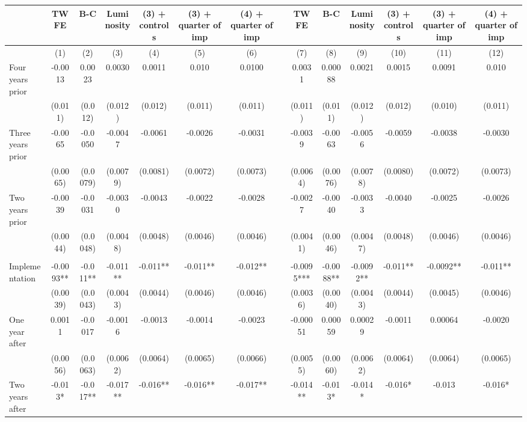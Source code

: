 \begin{tabular}{lccccccccccccc}
\toprule
      & TWFE  & B-C   & Luminosity & (3) + controls & (3) + quarter of imp & (4) + quarter of imp &       & TWFE  & B-C   & Luminosity & (3) + controls & (3) + quarter of imp & (4) + quarter of imp \\
\midrule
      & (1)   & (2)   & (3)   & (4)   & (5)   & (6)   &       & (7)   & (8)   & (9)   & (10)  & (11)  & (12) \\
\midrule
\midrule
Four years prior & -0.0013 & 0.0023 & 0.0030 & 0.0011 & 0.010 & 0.0100 &       & 0.0031 & 0.00088 & 0.0021 & 0.0015 & 0.0091 & 0.010 \\
      & (0.011) & (0.012) & (0.012) & (0.012) & (0.011) & (0.011) &       & (0.011) & (0.011) & (0.012) & (0.012) & (0.010) & (0.011) \\
Three years prior & -0.0065 & -0.0050 & -0.0047 & -0.0061 & -0.0026 & -0.0031 &       & -0.0039 & -0.0063 & -0.0056 & -0.0059 & -0.0038 & -0.0030 \\
      & (0.0065) & (0.0079) & (0.0079) & (0.0081) & (0.0072) & (0.0073) &       & (0.0064) & (0.0076) & (0.0078) & (0.0080) & (0.0072) & (0.0073) \\
Two years prior & -0.0039 & -0.0031 & -0.0030 & -0.0043 & -0.0022 & -0.0028 &       & -0.0027 & -0.0040 & -0.0033 & -0.0040 & -0.0025 & -0.0026 \\
      & (0.0044) & (0.0048) & (0.0048) & (0.0048) & (0.0046) & (0.0046) &       & (0.0041) & (0.0046) & (0.0047) & (0.0048) & (0.0046) & (0.0046) \\
      &       &       &       &       &       &       &       &       &       &       &       &       &  \\
Implementation & -0.0093** & -0.011** & -0.011** & -0.011** & -0.011** & -0.012** &       & -0.0095*** & -0.0088** & -0.0092** & -0.011** & -0.0092** & -0.011** \\
      & (0.0039) & (0.0043) & (0.0043) & (0.0044) & (0.0046) & (0.0046) &       & (0.0036) & (0.0040) & (0.0043) & (0.0044) & (0.0045) & (0.0046) \\
One year after & 0.0011 & -0.0017 & -0.0016 & -0.0013 & -0.0014 & -0.0023 &       & -0.00051 & 0.00059 & 0.00029 & -0.0011 & 0.00064 & -0.0020 \\
      & (0.0056) & (0.0063) & (0.0062) & (0.0064) & (0.0065) & (0.0066) &       & (0.0055) & (0.0060) & (0.0062) & (0.0064) & (0.0064) & (0.0065) \\
Two years after & -0.013* & -0.017** & -0.017** & -0.016** & -0.016** & -0.017** &       & -0.014** & -0.013* & -0.014* & -0.016* & -0.013 & -0.016* \\

\end{tabular}
